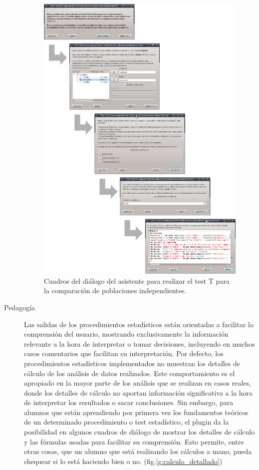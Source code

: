 \documentclass[10pt,twoside,spanish]{article}
\numberwithin{equation}{section}
\begin{document}
\begin{description}
\begin{figure}[htp]
\begin{center}
  \includegraphics[width=\textwidth]{img/asistente.png}
  \caption{Cuadros del diálogo del asistente para realizar el test T para la comparación de poblaciones independientes.}
  \label{g:asistente}
\end{center}
\end{figure}

\item[Pedagogía] Las salidas de los procedimientos estadísticos están orientadas a facilitar la comprensión del usuario, mostrando
exclusivamente la información relevante a la hora de interpretar o tomar decisiones, incluyendo en muchos casos comentarios que facilitan su
interpretación.
Por defecto, los procedimientos estadísticos implementados no muestran los detalles de cálculo de los análisis de datos realizados.
Este comportamiento es el apropiado en la mayor parte de los análisis que se realizan en casos reales, donde los detalles de cálculo no
aportan información significativa a la hora de interpretar los resultados o sacar conclusiones.
Sin embargo, para alumnos que están aprendiendo por primera vez los fundamentos teóricos de un determinado procedimiento o test estadístico,
el plugin da la posibilidad en algunos cuadros de diálogo de mostrar los detalles de cálculo y las fórmulas usadas para facilitar su
comprensión.
Esto permite, entre otras cosas, que un alumno que está realizando los cálculos a mano, pueda chequear si lo está haciendo bien o no. (fig.\ref{g:calculo_detallado}) 


\end{description}
\end{document}
